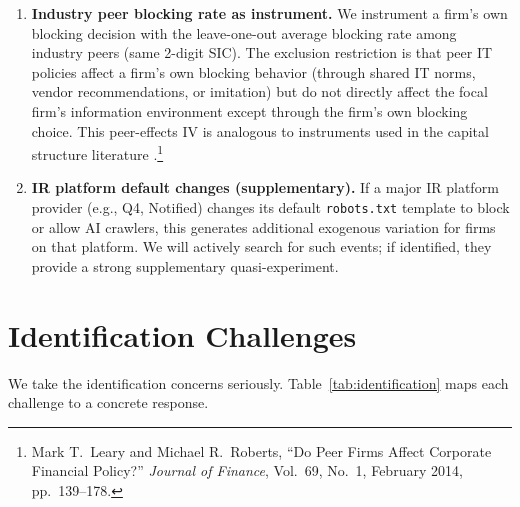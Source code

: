 \documentclass[12pt,a4paper]{article}
\begin{document}
\begin{enumerate}
    \item \textbf{Industry peer blocking rate as instrument.} We instrument a firm's own blocking decision with the leave-one-out average blocking rate among industry peers (same 2-digit SIC). The exclusion restriction is that peer IT policies affect a firm's own blocking behavior (through shared IT norms, vendor recommendations, or imitation) but do not directly affect the focal firm's information environment except through the firm's own blocking choice. This peer-effects IV is analogous to instruments used in the capital structure literature \citep[e.g.,][]{Leary2014}.\footnote{Mark T.~Leary and Michael R.~Roberts, ``Do Peer Firms Affect Corporate Financial Policy?'' \emph{Journal of Finance}, Vol.~69, No.~1, February 2014, pp.~139--178.}

    \item \textbf{IR platform default changes (supplementary).} If a major IR platform provider (e.g., Q4, Notified) changes its default \texttt{robots.txt} template to block or allow AI crawlers, this generates additional exogenous variation for firms on that platform. We will actively search for such events; if identified, they provide a strong supplementary quasi-experiment.
\end{enumerate}

\section{Identification Challenges}

We take the identification concerns seriously. Table~\ref{tab:identification} maps each challenge to a concrete response.
\end{document}
